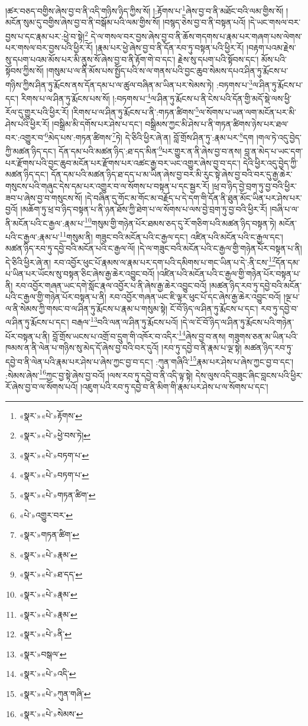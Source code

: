 །ཚར་བཅད་བགྱིས་ཞེས་བྱ་བ་ནི་འདི་གཉིས་ཉིད་ཀྱིས་སོ། །:རྟོགས་པ་\footnote{«སྣར་»«པེ་»རྟོགས་}ཞེས་བྱ་བ་ནི་མཐོང་བའི་ལམ་གྱིས་སོ། །མངོན་སུམ་དུ་བགྱིས་ཞེས་བྱ་བ་ནི་བསྒོམ་པའི་ལམ་གྱིས་སོ། །བསྙད་ཅེས་བྱ་བ་ནི་བསྟན་པའོ། །དེ་ཡང་གསལ་བར་བྱས་པ་དང་རྣམ་པར་:ཕྱེ་བ་སྟེ།\footnote{«སྣར་»«པེ་»ཕྱེ་བས་ཏེ།} དེ་ལ་གསལ་བར་བྱས་ཞེས་བྱ་བ་ནི་ཆོས་གདགས་པ་རྣམ་པར་གཞག་པས་ལེགས་པར་གསལ་བར་བྱས་པའི་ཕྱིར་རོ། །རྣམ་པར་ཕྱེ་ཞེས་བྱ་བ་ནི་དོན་རབ་ཏུ་བསྟན་པའི་ཕྱིར་རོ། །བརྟག་པའམ་རྗེས་སུ་དཔག་པའམ་མོས་པར་མི་ནུས་སོ་ཞེས་བྱ་བ་ནི་རྟོག་གེ་བ་དང་། རྗེས་སུ་དཔག་པའི་སྟོབས་དང་། མོས་པའི་སྟོབས་ཀྱིས་སོ། །གསུམ་པ་ལ་ནི་མོས་པས་སྤྱོད་པའི་ས་ལ་གནས་པའི་བྱང་ཆུབ་སེམས་དཔའ་ཤིན་ཏུ་རྨོངས་པ་གཉིས་ཀྱིས་ཤིན་ཏུ་རྨོངས་ནས་དོན་དམ་པ་ལ་ཚུལ་བཞིན་མ་ཡིན་པར་སེམས་ཏེ། :བཏགས་པ་\footnote{«སྣར་»«པེ་»བཏག་པ་}ལ་ཤིན་ཏུ་རྨོངས་པ་དང་། རིགས་པ་ལ་ཤིན་ཏུ་རྨོངས་པས་སོ། །:བཏགས་པ་\footnote{«སྣར་»«པེ་»བཏག་པ་}ལ་ཤིན་ཏུ་རྨོངས་པ་ནི་ངེས་པའི་དོན་གྱི་མདོ་སྡེ་ལས་ཕྱི་རོལ་དུ་གྱུར་པའི་ཕྱིར་རོ། །རིགས་པ་ལ་ཤིན་ཏུ་རྨོངས་པ་ནི་:གཏན་ཚིགས་\footnote{«སྣར་»«པེ་»གཏན་ཚིག་}ལ་སོགས་པ་ཡན་ལག་མངོན་པར་མི་ཤེས་པའི་ཕྱིར་རོ། །བསྒྲིམ་མི་དགོས་པར་ཤེས་པ་དང་། བསྒྲིམས་ཀྱང་མི་ཤེས་པ་ནི་གཏན་ཚིགས་ཉེས་པར་ཐལ་བར་:འགྱུར་བ་\footnote{«པེ་»འགྱུར་བར་}མེད་པས་:གཏན་ཚིགས་\footnote{«སྣར་»གཏན་ཚིག་}ཏེ། དེ་ཅིའི་ཕྱིར་ཞེ་ན། བློ་གྲོས་ཤིན་ཏུ་:རྣམ་པར་\footnote{«སྣར་»«པེ་»རྣམ་}དག །གལ་ཏེ་འདུ་བྱེད་ཀྱི་མཚན་ཉིད་དང་། དོན་དམ་པའི་མཚན་ཉིད་:ཐ་དད་མིན་\footnote{«སྣར་»«པེ་»ཐ་དད་}པར་གྱུར་ན་ནི་ཞེས་བྱ་བ་ནས། བླ་ན་མེད་པ་ཡང་དག་པར་རྫོགས་པའི་བྱང་ཆུབ་མངོན་པར་རྫོགས་པར་འཚང་རྒྱ་བར་ཡང་འགྱུར་ཞེས་བྱ་བ་དང་། དེའི་ཕྱིར་འདུ་བྱེད་ཀྱི་མཚན་ཉིད་དང་། དོན་དམ་པའི་མཚན་ཉིད་ཐ་དད་པ་མ་ཡིན་ཞེས་བྱ་བར་མི་རུང་སྟེ་ཞེས་བྱ་བའི་བར་དུ་རྒྱ་ཆེར་གསུངས་པའི་གཞུང་དེས་དམ་པར་འགྱུར་བ་ལ་སོགས་པ་བསྟན་པ་དང་སྦྱར་རོ། །ཕྲ་བ་ཉིད་བྱེ་བྲག་ཏུ་བྱ་བའི་ཕྱིར་ཟབ་པ་ཞེས་བྱ་བ་གསུངས་སོ། །དེ་བཞིན་དུ་གོང་མ་གོང་མ་བརྗོད་པ་དེ་དག་གི་དོན་ནི་ཐུན་མོང་ཡིན་པར་ཤེས་པར་བྱའོ། །མཆོག་ཏུ་ཕྲ་བ་ཉིད་བསྟན་པ་ནི་ཉན་ཐོས་ཀྱི་ཐེག་པ་ལ་སོགས་པ་ལས་བྱེ་བྲག་ཏུ་བྱ་བའི་ཕྱིར་རོ། །བཞི་པ་ལ་ནི་མངོན་པའི་ང་རྒྱལ་:རྣམ་པ་\footnote{«སྣར་»«པེ་»རྣམ་}གསུམ་གྱི་གཉེན་པོར་ཐམས་ཅད་དུ་རོ་གཅིག་པའི་མཚན་ཉིད་བསྟན་ཏེ། མངོན་པའི་ང་རྒྱལ་:རྣམ་པ་\footnote{«སྣར་»«པེ་»རྣམ་}གསུམ་ནི། གཟུང་བའི་མངོན་པའི་ང་རྒྱལ་དང་། འཛིན་པའི་མངོན་པའི་ང་རྒྱལ་དང་། མཚན་ཉིད་རབ་ཏུ་དབྱེ་བའི་མངོན་པའི་ང་རྒྱལ་ལོ། །དེ་ལ་གཟུང་བའི་མངོན་པའི་ང་རྒྱལ་གྱི་གཉེན་པོར་བསྟན་པ་ནི། དེ་ཅིའི་ཕྱིར་ཞེ་ན། རབ་འབྱོར་ཕུང་པོ་རྣམས་ལ་རྣམ་པར་དག་པའི་དམིགས་པ་གང་ཡིན་པ་དེ་:ནི་ངས་\footnote{«སྣར་»«པེ་»ནི་}དོན་དམ་པ་ཡིན་པར་ཡོངས་སུ་བསྟན་ཅིང་ཞེས་རྒྱ་ཆེར་འབྱུང་བའོ། །འཛིན་པའི་མངོན་པའི་ང་རྒྱལ་གྱི་གཉེན་པོར་བསྟན་པ་ནི། རབ་འབྱོར་གཞན་ཡང་དགེ་སློང་རྣལ་འབྱོར་པ་ནི་ཞེས་རྒྱ་ཆེར་འབྱུང་བའོ། །མཚན་ཉིད་རབ་ཏུ་དབྱེ་བའི་མངོན་པའི་ང་རྒྱལ་གྱི་གཉེན་པོར་བསྟན་པ་ནི། རབ་འབྱོར་གཞན་ཡང་ཇི་ལྟར་ཕུང་པོ་དང་ཞེས་རྒྱ་ཆེར་འབྱུང་བའོ། །ལྔ་པ་ལ་ནི་སེམས་ཀྱི་གསང་བ་ལ་ཤིན་ཏུ་རྨོངས་པ་རྣམ་པ་གསུམ་སྟེ། ངོ་བོ་ཉིད་ལ་ཤིན་ཏུ་རྨོངས་པ་དང་། རབ་ཏུ་དབྱེ་བ་ལ་ཤིན་ཏུ་རྨོངས་པ་དང་། བརྒལ་\footnote{«སྣར་»བསྒལ་}བའི་ལན་ལ་ཤིན་ཏུ་རྨོངས་པའོ། །དེ་ལ་ངོ་བོ་ཉིད་ལ་ཤིན་ཏུ་རྨོངས་པའི་གཉེན་པོར་བསྟན་པ་ནི། བློ་གྲོས་ཡངས་པ་འགྲོ་བ་དྲུག་གི་འཁོར་བ་འདིར་\footnote{«སྣར་»«པེ་»འདི་}ཞེས་བྱ་བ་ནས། གཟུགས་ཅན་མ་ཡིན་པའི་ཁམས་ན་ནི་ལེན་པ་གཉིས་སུ་མེད་དོ་ཞེས་བྱ་བའི་བར་དུའོ། །རབ་ཏུ་དབྱེ་བ་ནི་རྣམ་པ་ལྔ་སྟེ། མཚན་ཉིད་རབ་ཏུ་དབྱེ་བ་ནི་ལེན་པའི་རྣམ་པར་ཤེས་པ་ཞེས་ཀྱང་བྱ་བ་དང་། :ཀུན་གཞིའི་\footnote{«སྣར་»«པེ་»ཀུན་གཞི་}རྣམ་པར་ཤེས་པ་ཞེས་ཀྱང་བྱ་བ་དང་། :སེམས་ཞེས་\footnote{«སྣར་»«པེ་»སེམས་}ཀྱང་བྱ་སྟེ་ཞེས་བྱ་བའོ། །ལས་རབ་ཏུ་དབྱེ་བ་ནི་འདི་ལྟ་སྟེ། དེས་ལུས་འདི་བཟུང་ཞིང་བླངས་པའི་ཕྱིར་རོ་ཞེས་བྱ་བ་ལ་སོགས་པའོ། །འཇུག་པའི་རབ་ཏུ་དབྱེ་བ་ནི་མིག་གི་རྣམ་པར་ཤེས་པ་ལ་སོགས་པ་དང་། 